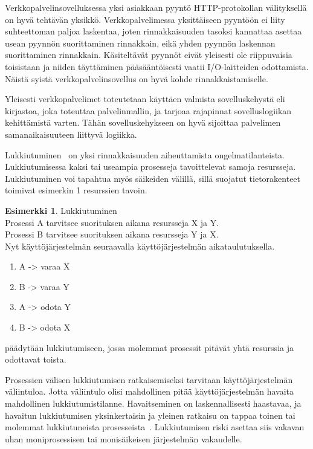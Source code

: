 \documentclass[finnish]{tktltiki2}
\theoremstyle{definition}
\newtheorem{esim}[lau]{Esimerkki}
\theoremstyle{remark}
\begin{document}
Verkkopalvelinsovelluksessa yksi asiakkaan pyyntö HTTP-protokollan välityksellä
on hyvä tehtävän yksikkö. Verkkopalvelimessa yksittäiseen
pyyntöön ei liity suhteettoman paljoa laskentaa, joten
rinnakkaisuuden tasoksi kannattaa asettaa usean pyynnön
suorittaminen rinnakkain, eikä yhden pyynnön laskennan
suorittaminen rinnakkain.
Käsiteltävät pyynnöt eivät yleisesti ole riippuvaisia
toisistaan ja niiden täyttäminen pääsääntöisesti vaatii I/O-laitteiden odottamista.
Näistä syistä verkkopalvelinsovellus on hyvä kohde rinnakkaistamiselle.

Yleisesti verkkopalvelimet toteutetaan käyttäen valmista sovelluskehystä eli kirjastoa,
joka toteuttaa palvelinmallin, ja tarjoaa rajapinnat sovelluslogiikan
kehittämistä varten. Tähän sovelluskehykseen on hyvä sijoittaa
palvelimen samanaikaisuuteen liittyvä logiikka.

Lukkiutuminen~\cite{stallings_operating_2018}
on yksi rinnakkaisuuden aiheuttamista ongelmatilanteista.
Lukkiutumisessa kaksi tai useampia prosesseja tavoittelevat samoja resursseja.
Lukkiutuminen voi tapahtua myös säikeiden välillä, sillä
suojatut tietorakenteet toimivat esimerkin 1 resurssien tavoin.

\begin{center}
  \begin{esim}
    Lukkiutuminen \\
    Prosessi A tarvitsee suorituksen aikana resursseja X ja Y. \\
    Prosessi B tarvitsee suorituksen aikana resursseja Y ja X. \\
    Nyt käyttöjärjestelmän seuraavalla käyttöjärjestelmän aikataulutuksella.
    \begin{enumerate}
      \item A -> varaa X
      \item B -> varaa Y
      \item A -> odota Y
      \item B -> odota X
    \end{enumerate}
    päädytään lukkiutumiseen, jossa molemmat prosessit
    pitävät yhtä resurssia ja odottavat toista.
  \end{esim}
\end{center}

Prosessien välisen lukkiutumisen ratkaisemiseksi tarvitaan
käyttöjärjestelmän väliintuloa. Jotta väliintulo olisi mahdollinen pitää
käyttöjärjestelmän havaita mahdollinen lukkiutumistilanne.
Havaitseminen on laskennallisesti haastavaa, ja havaitun lukkiutumisen
yksinkertaisin ja yleinen ratkaisu on tappaa toinen
tai molemmat lukkiutuneista prosesseista~\cite{stallings_operating_2018}.
Lukkiutumisen riski asettaa siis vakavan uhan moniprosessisen tai monisäikeisen
järjestelmän vakaudelle.
\end{document}
